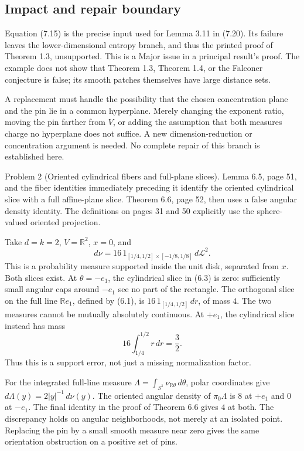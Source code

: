 \documentclass[10pt]{article}
\begin{document}
\subsection*{Impact and repair boundary}
Equation (7.15) is the precise input used for Lemma 3.11 in (7.20). Its failure leaves the lower-dimensional entropy branch, and thus the printed proof of Theorem 1.3, unsupported. This is a Major issue in a principal result’s proof. The example does not show that Theorem 1.3, Theorem 1.4, or the Falconer conjecture is false; its smooth patches themselves have large distance sets.\par
A replacement must handle the possibility that the chosen concentration plane and the pin lie in a common hyperplane. Merely changing the exponent ratio, moving the pin farther from \(V\), or adding the assumption that both measures charge no hyperplane does not suffice. A new dimension-reduction or concentration argument is needed. No complete repair of this branch is established here.\par
Problem 2 (Oriented cylindrical fibers and full-plane slices).  Lemma 6.5, page 51, and the fiber identities immediately preceding it identify the oriented cylindrical slice with a full affine-plane slice. Theorem 6.6, page 52, then uses a false angular density identity. The definitions on pages 31 and 50 explicitly use the sphere-valued oriented projection.\par
Take \(d=k=2\), \(V=\mathbb R^2\), \(x=0\), and \[d\nu=16\,1_{[1/4,1/2]\times[-1/8,1/8]}\,d\mathcal L^2.\] This is a probability measure supported inside the unit disk, separated from \(x\). Both slices exist. At \(\theta=-e_1\), the cylindrical slice in (6.3) is zero: sufficiently small angular caps around \(-e_1\) see no part of the rectangle. The orthogonal slice on the full line \(\mathbb Re_1\), defined by (6.1), is \(16\,1_{[1/4,1/2]}\,dr\), of mass \(4\). The two measures cannot be mutually absolutely continuous. At \(+e_1\), the cylindrical slice instead has mass \[16\int_{1/4}^{1/2}r\,dr=\frac32.\] Thus this is a support error, not just a missing normalization factor.\par
For the integrated full-line measure \(\Lambda=\int_{S^1}\nu_{\mathbb R\theta}\,d\theta\), polar coordinates give \(d\Lambda(y)=2|y|^{-1}\,d\nu(y)\). The oriented angular density of \(\pi_0\Lambda\) is \(8\) at \(+e_1\) and \(0\) at \(-e_1\). The final identity in the proof of Theorem 6.6 gives \(4\) at both. The discrepancy holds on angular neighborhoods, not merely at an isolated point. Replacing the pin by a small smooth measure near zero gives the same orientation obstruction on a positive set of pins.\par
\end{document}
